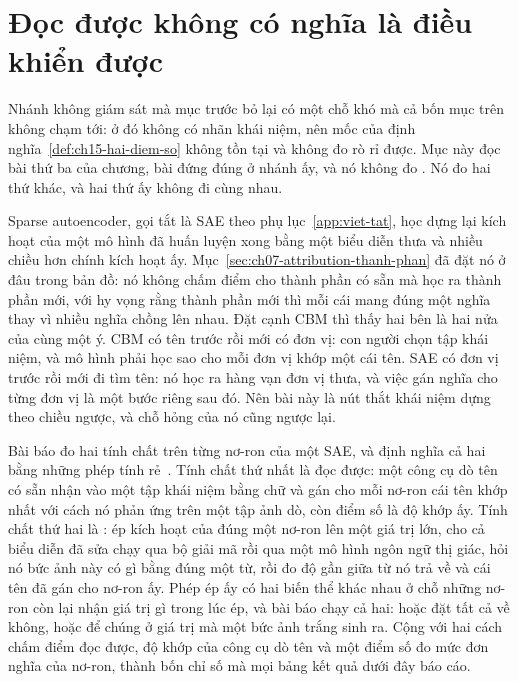 \section{Đọc được không có nghĩa là điều khiển được}
\label{sec:ch15-doc-duoc-dieu-khien-duoc}

%
Nhánh không giám sát mà mục trước bỏ lại có một chỗ khó mà cả bốn mục trên
không chạm tới: ở đó không có nhãn khái niệm, nên mốc của
định nghĩa~\ref{def:ch15-hai-diem-so} không tồn tại và không đo rò rỉ được.
Mục này đọc bài thứ ba của chương, bài đứng đúng ở nhánh ấy, và nó không đo
. Nó đo hai thứ khác, và hai thứ ấy không đi cùng nhau.

%
Sparse autoencoder, gọi tắt là SAE theo phụ lục~\ref{app:viet-tat}, học dựng lại
kích hoạt của một mô hình đã huấn luyện xong bằng một biểu diễn thưa và nhiều
chiều hơn chính kích hoạt ấy. Mục~\ref{sec:ch07-attribution-thanh-phan} đã đặt
nó ở đâu trong bản đồ: nó không chấm điểm cho thành phần có sẵn mà học ra thành
phần mới, với hy vọng rằng thành phần mới thì mỗi cái mang đúng một nghĩa thay
vì nhiều nghĩa chồng lên nhau. Đặt cạnh CBM thì thấy hai bên là hai nửa của cùng
một ý. CBM có tên trước rồi mới có đơn vị: con người chọn tập khái niệm, và mô
hình phải học sao cho mỗi đơn vị khớp một cái tên. SAE có đơn vị trước rồi mới
đi tìm tên: nó học ra hàng vạn đơn vị thưa, và việc gán nghĩa cho từng đơn vị là
một bước riêng sau đó. Nên bài này là nút thắt khái niệm dựng theo chiều ngược,
và chỗ hỏng của nó cũng ngược lại.

%
Bài báo đo hai tính chất trên từng nơ-ron của một SAE, và định nghĩa cả hai bằng
những phép tính rẻ~\autocite{p32cbmsae}. Tính chất thứ nhất là đọc được: một
công cụ dò tên có sẵn nhận vào một tập khái niệm bằng chữ và gán cho mỗi nơ-ron
cái tên khớp nhất với cách nó phản ứng trên một tập ảnh dò, còn điểm số là độ
khớp ấy. Tính chất thứ hai là : ép kích
hoạt của đúng một nơ-ron lên một giá trị lớn, cho cả biểu diễn đã sửa chạy qua
bộ giải mã rồi qua một mô hình ngôn ngữ thị giác, hỏi nó bức ảnh này có gì bằng
đúng một từ, rồi đo độ gần giữa từ nó trả về và cái tên đã gán cho nơ-ron ấy.
Phép ép ấy có hai biến thể khác nhau ở chỗ những nơ-ron còn lại nhận giá trị gì
trong lúc ép, và bài báo chạy cả hai: hoặc đặt tất cả về không, hoặc để chúng ở
giá trị mà một bức ảnh trắng sinh ra. Cộng với hai cách chấm điểm đọc được, độ
khớp của công cụ dò tên và một điểm số đo mức đơn nghĩa của nơ-ron, thành bốn
chỉ số mà mọi bảng kết quả dưới đây báo cáo.

